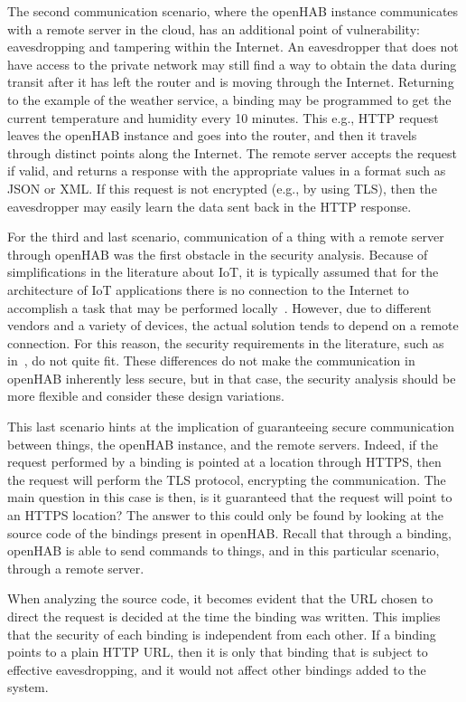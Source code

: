 \documentclass[12pt]{article}
\begin{document}
The second communication scenario, where the openHAB instance communicates with a remote server in the cloud, has an additional point of vulnerability: eavesdropping and tampering within the Internet. An eavesdropper that does not have access to the private network may still find a way to obtain the data during transit after it has left the router and is moving through the Internet. Returning to the example of the weather service, a binding may be programmed to get the current temperature and humidity every 10 minutes. This e.g., HTTP request leaves the openHAB instance and goes into the router, and then it travels through distinct points along the Internet. The remote server accepts the request if valid, and returns a response with the appropriate values in a format such as JSON or XML. If this request is not encrypted (e.g., by using TLS), then the eavesdropper may easily learn the data sent back in the HTTP response.

For the third and last scenario, communication of a thing with a remote server through openHAB was the first obstacle in the security analysis. Because of simplifications in the literature about IoT, it is typically assumed that for the architecture of IoT applications there is no connection to the Internet to accomplish a task that may be performed locally~\cite{ALABA201710}. However, due to different vendors and a variety of devices, the actual solution tends to depend on a remote connection. For this reason, the security requirements in the literature, such as in~\cite{taekim}, do not quite fit. These differences do not make the communication in openHAB inherently less secure, but in that case, the security analysis should be more flexible and consider these design variations. 

This last scenario hints at the implication of guaranteeing secure communication between things, the openHAB instance, and the remote servers. Indeed, if the request performed by a binding is pointed at a location through HTTPS, then the request will perform the TLS protocol, encrypting the communication. The main question in this case is then, is it guaranteed that the request will point to an HTTPS location? The answer to this could only be found by looking at the source code of the bindings present in openHAB. Recall that through a binding, openHAB is able to send commands to things, and in this particular scenario, through a remote server.

When analyzing the source code, it becomes evident that the URL chosen to direct the request is decided at the time the binding was written. This implies that the security of each binding is independent from each other. If a binding points to a plain HTTP URL, then it is only that binding that is subject to effective eavesdropping, and it would not affect other bindings added to the system.
\end{document}
